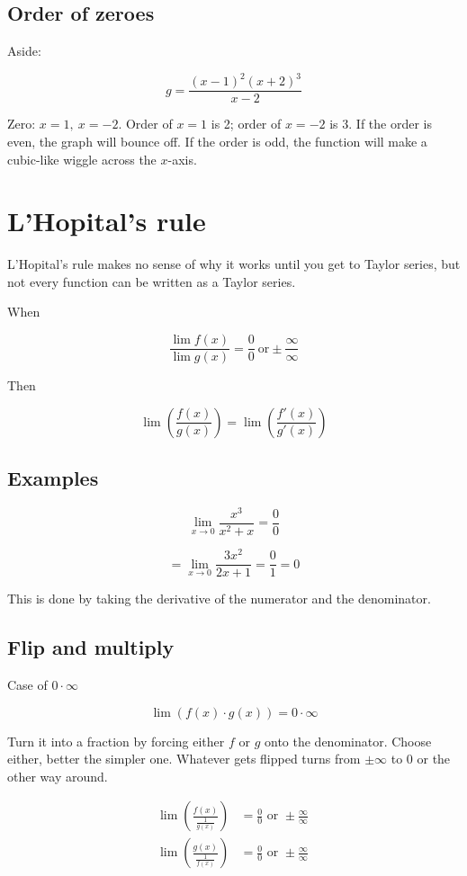\documentclass[12pt]{article}
\theoremstyle{plain}
\theoremstyle{remark}
\theoremstyle{definition}
\begin{document}
\subsection{Order of zeroes}

Aside:

\[g = \frac{(x - 1)^{2}(x + 2)^{3}}{x - 2}\]

Zero: \(x = 1,\ x = - 2\). Order of \(x = 1\) is 2; order of \(x = - 2\)
is 3. If the order is even, the graph will bounce off. If the order is
odd, the function will make a cubic-like wiggle across the \(x\)-axis.


\section{L'Hopital's rule}

L'Hopital's rule makes no sense of why it works until you get to Taylor
series, but not every function can be written as a Taylor series.

When

\[\frac{\lim{f(x)}}{\lim{g(x)}} = \frac{0}{0}\ \text{or} \pm \frac{\infty}{\infty}\]

Then

\[\lim\left( \frac{f(x)}{g(x)} \right) = \lim\left( \frac{f'(x)}{g'(x)} \right)\]


\subsection{Examples}

\[\lim_{x \rightarrow 0}\frac{x^{3}}{x^{2} + x} = \frac{0}{0}\]

\[= \lim_{x \rightarrow 0}\frac{3x^{2}}{2x + 1} = \frac{0}{1} = 0\]

This is done by taking the derivative of the numerator and the
denominator.


\subsection{Flip and multiply}

Case of \(0 \cdot \infty\)

\[\lim\left( f(x) \cdot g(x) \right) = 0 \cdot \infty\]

Turn it into a fraction by forcing either \(f\) or \(g\) onto the
denominator. Choose either, better the simpler one. Whatever gets
flipped turns from \(\pm \infty\) to 0 or the other way around.

\begin{align*}
\lim\left( \frac{f(x)}{\frac{1}{g(x)}} \right) &= \frac{0}{0}\text{\ or\ } \pm \frac{\infty}{\infty} \\
\lim\left( \frac{g(x)}{\frac{1}{f(x)}} \right) &= \frac{0}{0}\text{\ or\ } \pm \frac{\infty}{\infty}\
\end{align*}
\end{document}

